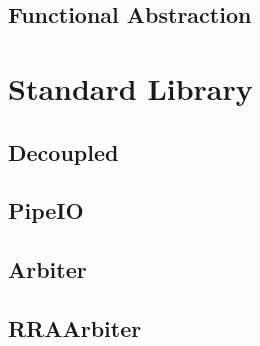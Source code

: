 \documentclass[10pt,landscape]{article}
\begin{document}
\begin{multicols}{3}
\subsection{Functional Abstraction}

\section{Standard Library}
\subsection{Decoupled}
\subsection{PipeIO}
\subsection{Arbiter}
\subsection{RRAArbiter}


\end{multicols}
\end{document}
